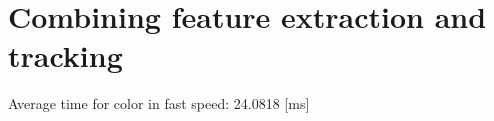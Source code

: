 %





\chapter{Combining feature extraction and tracking} %
\label{chap:combining_feature_extraction_and_tracking}

	\ifx \plots \yes
	\fi

	\qRobotColorFastPlot
	\speedColorFastPlot
	\cameraPoseColorFastPlot
	\errorColorPlot

Average time for color in fast speed: 24.0818 [ms]

